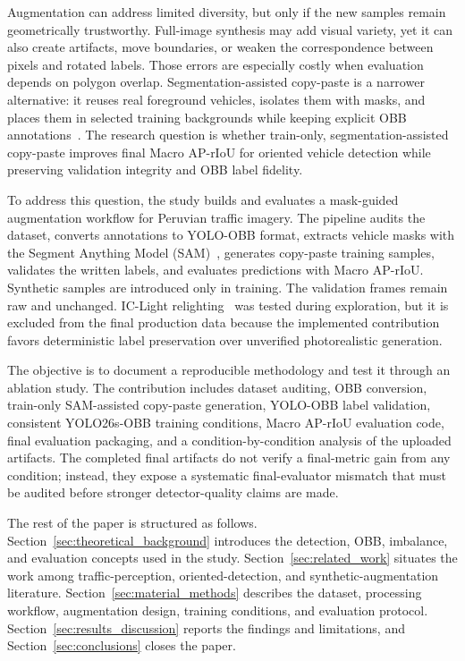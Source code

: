 Augmentation can address limited diversity, but only if the new samples remain geometrically trustworthy. Full-image synthesis may add visual variety, yet it can also create artifacts, move boundaries, or weaken the correspondence between pixels and rotated labels. Those errors are especially costly when evaluation depends on polygon overlap. Segmentation-assisted copy-paste is a narrower alternative: it reuses real foreground vehicles, isolates them with masks, and places them in selected training backgrounds while keeping explicit OBB annotations~\cite{Rahat2024,Mumuni2024,HuangW2025}. The research question is whether train-only, segmentation-assisted copy-paste improves final Macro AP-rIoU for oriented vehicle detection while preserving validation integrity and OBB label fidelity.

To address this question, the study builds and evaluates a mask-guided augmentation workflow for Peruvian traffic imagery. The pipeline audits the dataset, converts annotations to YOLO-OBB format, extracts vehicle masks with the Segment Anything Model (SAM)~\cite{Kirillov2023SAM}, generates copy-paste training samples, validates the written labels, and evaluates predictions with Macro AP-rIoU. Synthetic samples are introduced only in training. The validation frames remain raw and unchanged. IC-Light relighting~\cite{Zhang2025ICLight} was tested during exploration, but it is excluded from the final production data because the implemented contribution favors deterministic label preservation over unverified photorealistic generation.

The objective is to document a reproducible methodology and test it through an ablation study. The contribution includes dataset auditing, OBB conversion, train-only SAM-assisted copy-paste generation, YOLO-OBB label validation, consistent YOLO26s-OBB training conditions, Macro AP-rIoU evaluation code, final evaluation packaging, and a condition-by-condition analysis of the uploaded artifacts. The completed final artifacts do not verify a final-metric gain from any condition; instead, they expose a systematic final-evaluator mismatch that must be audited before stronger detector-quality claims are made.

The rest of the paper is structured as follows. Section~\ref{sec:theoretical_background} introduces the detection, OBB, imbalance, and evaluation concepts used in the study. Section~\ref{sec:related_work} situates the work among traffic-perception, oriented-detection, and synthetic-augmentation literature. Section~\ref{sec:material_methods} describes the dataset, processing workflow, augmentation design, training conditions, and evaluation protocol. Section~\ref{sec:results_discussion} reports the findings and limitations, and Section~\ref{sec:conclusions} closes the paper.
